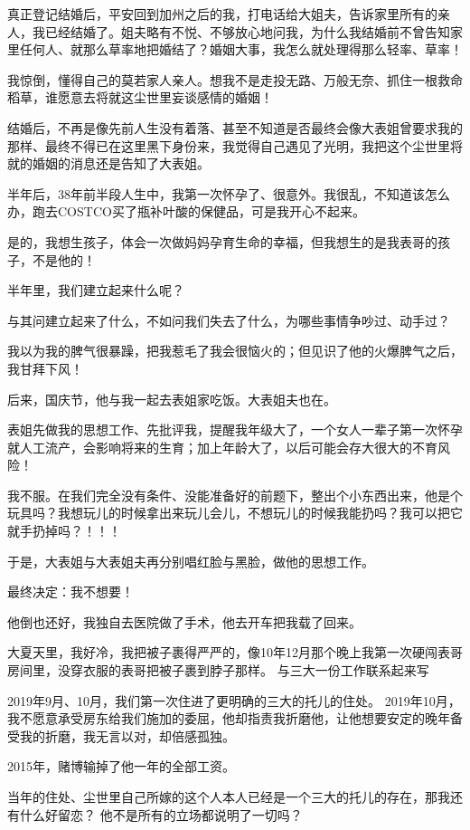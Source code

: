 \documentclass[9pt, b5paper]{article}
\begin{document}
真正登记结婚后，平安回到加州之后的我，打电话给大姐夫，告诉家里所有的亲人，我已经结婚了。姐夫略有不悦、不够放心地问我，为什么我结婚前不曾告知家里任何人、就那么草率地把婚结了？婚姻大事，我怎么就处理得那么轻率、草率！

我惊倒，懂得自己的莫若家人亲人。想我不是走投无路、万般无奈、抓住一根救命稻草，谁愿意去将就这尘世里妄谈感情的婚姻！

结婚后，不再是像先前人生没有着落、甚至不知道是否最终会像大表姐曾要求我的那样、最终不得已在这里黑下身份来，我觉得自己遇见了光明，我把这个尘世里将就的婚姻的消息还是告知了大表姐。

半年后，38年前半段人生中，我第一次怀孕了、很意外。我很乱，不知道该怎么办，跑去COSTCO买了瓶补叶酸的保健品，可是我开心不起来。

是的，我想生孩子，体会一次做妈妈孕育生命的幸福，但我想生的是我表哥的孩子，不是他的！

半年里，我们建立起来什么呢？

与其问建立起来了什么，不如问我们失去了什么，为哪些事情争吵过、动手过？

我以为我的脾气很暴躁，把我惹毛了我会很恼火的；但见识了他的火爆脾气之后，我甘拜下风！

后来，国庆节，他与我一起去表姐家吃饭。大表姐夫也在。

表姐先做我的思想工作、先批评我，提醒我年级大了，一个女人一辈子第一次怀孕就人工流产，会影响将来的生育；加上年龄大了，以后可能会存大很大的不育风险！

我不服。在我们完全没有条件、没能准备好的前题下，整出个小东西出来，他是个玩具吗？我想玩儿的时候拿出来玩儿会儿，不想玩儿的时候我能扔吗？我可以把它就手扔掉吗？！！！

于是，大表姐与大表姐夫再分别唱红脸与黑脸，做他的思想工作。

最终决定：我不想要！

他倒也还好，我独自去医院做了手术，他去开车把我载了回来。

大夏天里，我好冷，我把被子裹得严严的，像10年12月那个晚上我第一次硬闯表哥房间里，没穿衣服的表哥把被子裹到脖子那样。
与三大一份工作联系起来写

2019年9月、10月，我们第一次住进了更明确的三大的托儿的住处。
2019年10月，我不愿意承受房东给我们施加的委屈，他却指责我折磨他，让他想要安定的晚年备受我的折磨，我无言以对，却倍感孤独。

2015年，赌博输掉了他一年的全部工资。


当年的住处、尘世里自己所嫁的这个人本人已经是一个三大的托儿的存在，那我还有什么好留恋？
他不是所有的立场都说明了一切吗？
\end{document}
